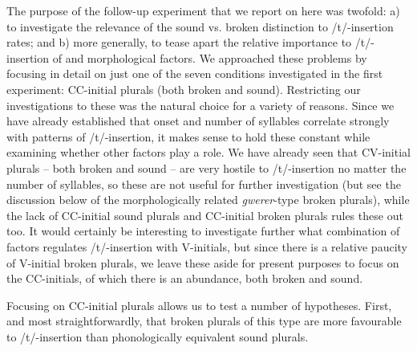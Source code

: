 \documentclass[output=paper]{langsci/langscibook}
\begin{document}
The purpose of the follow-up experiment that we report on here was twofold: a) to investigate the relevance of the sound vs. broken  distinction to /t/-insertion rates; and b) more generally, to tease apart the relative importance to /t/-insertion of  and morphological factors. We approached these problems by focusing in detail on just one of the seven conditions investigated in the first experiment: CC-initial  plurals (both broken and sound). Restricting our investigations to these was the natural choice for a variety of reasons. Since we have already established that onset and number of syllables correlate strongly with patterns of /t/-insertion, it makes sense to hold these constant while examining whether other factors play a role. We have already seen that CV-initial plurals – both broken and sound – are very hostile to /t/-insertion no matter the number of syllables, so these are not useful for further investigation (but see the discussion below of the morphologically related \textit{gwerer}{}-type broken plurals), while the lack of  CC-initial sound plurals and  CC-initial broken plurals rules these out too. It would certainly be interesting to investigate further what combination of factors regulates /t/-insertion with V-initials, but since there is a relative paucity of V-initial broken plurals, we leave these aside for present purposes to focus on the  CC-initials, of which there is an abundance, both broken and sound. 

Focusing on  CC-initial plurals allows us to test a number of hypotheses. First, and most straightforwardly, that broken plurals of this type are more favourable to /t/-insertion than phonologically equivalent sound plurals. 
\end{document}
